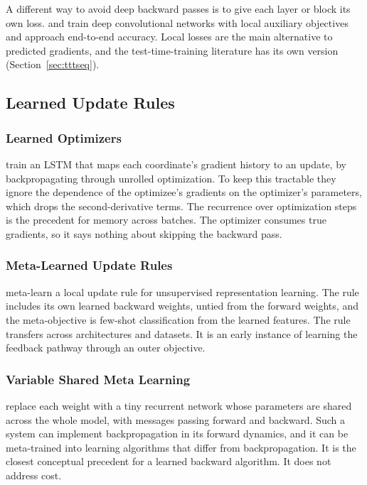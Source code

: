 \documentclass{article}
\begin{document}
A different way to avoid deep backward passes is to give each layer or block
its own loss. \textcite{nokland2019local} and \textcite{belilovsky2020decoupled}
train deep convolutional networks with local auxiliary objectives and approach
end-to-end accuracy. Local losses are the main alternative to predicted
gradients, and the test-time-training literature has its own version
(Section~\ref{sec:tttseq}).

\subsection{Learned Update Rules}

\subsubsection{Learned Optimizers}

\textcite{andrychowicz2016learning} train an LSTM that maps each coordinate's
gradient history to an update, by backpropagating through unrolled
optimization. To keep this tractable they ignore the dependence of the
optimizee's gradients on the optimizer's parameters, which drops the
second-derivative terms. The recurrence over optimization steps is the
precedent for memory across batches. The optimizer consumes true gradients, so
it says nothing about skipping the backward pass.

\subsubsection{Meta-Learned Update Rules}

\textcite{metz2019metalearning} meta-learn a local update rule for unsupervised
representation learning. The rule includes its own learned backward weights,
untied from the forward weights, and the meta-objective is few-shot
classification from the learned features. The rule transfers across
architectures and datasets. It is an early instance of learning the feedback
pathway through an outer objective.

\subsubsection{Variable Shared Meta Learning}

\textcite{kirsch2021vsml} replace each weight with a tiny recurrent network
whose parameters are shared across the whole model, with messages passing
forward and backward. Such a system can implement backpropagation in its
forward dynamics, and it can be meta-trained into learning algorithms that
differ from backpropagation. It is the closest conceptual precedent for a
learned backward algorithm. It does not address cost.
\end{document}
